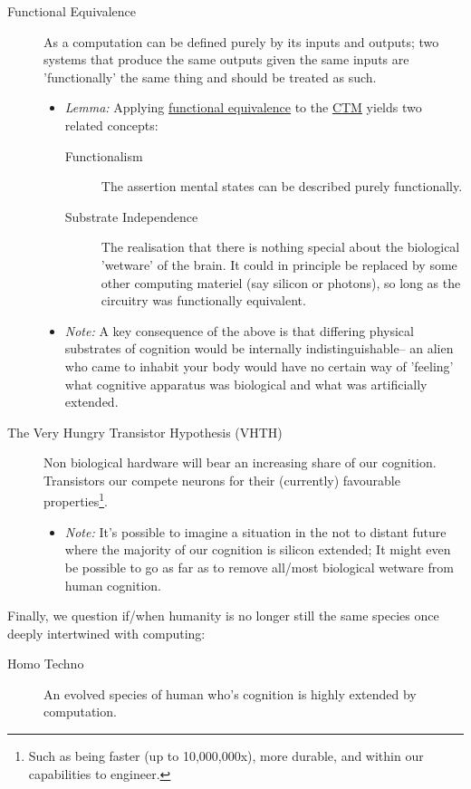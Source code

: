 \documentclass[logo,bsc,singlespacing,parskip]{infthesis}
\begin{document}
{\begin{mdframed}
\begin{description}
\item[{\label{orge7d4074}Functional Equivalence}] As a computation can be defined purely by its inputs and outputs; two systems that produce the same outputs given the same inputs are 'functionally' the same thing and should be treated as such.
\begin{itemize}
\item \emph{Lemma:} Applying \hyperref[orge7d4074]{functional equivalence} to the \hyperref[org1b7df7a]{CTM} yields two related concepts:
\begin{description}
\item[{Functionalism}] The assertion mental states can be described purely functionally.
\item[{Substrate Independence}] The realisation that there is nothing special about the biological 'wetware' of the brain.
It could in principle be replaced by some other computing materiel (say silicon or photons), so long as the circuitry was functionally equivalent.
\end{description}
\item \emph{Note:} A key consequence of the above is that differing physical substrates of cognition would be internally indistinguishable-- an alien who came to inhabit your body would have no certain way of 'feeling' what cognitive apparatus was biological and what was artificially extended.
\end{itemize}
\end{description}
\end{mdframed}

\begin{mdframed}
\begin{description}
\item[{The Very Hungry Transistor Hypothesis (VHTH)}] Non biological hardware will bear an increasing share of our cognition. Transistors our compete neurons for their (currently) favourable properties\footnote{Such as being faster (up to 10,000,000x), more durable, and within our capabilities to engineer.}.
\begin{itemize}
\item \emph{Note:} It's possible to imagine a situation in the not to distant future where the majority of our cognition is silicon extended; It might even be possible to go as far as to remove all/most biological wetware from human cognition.
\end{itemize}
\end{description}
\end{mdframed}

Finally, we question if/when humanity is no longer still the same species once deeply intertwined with computing:

\begin{mdframed}
\begin{description}
\item[{Homo Techno}] An evolved species of human who's cognition is highly extended by computation.
\end{description}
\end{mdframed}
}
\end{document}
